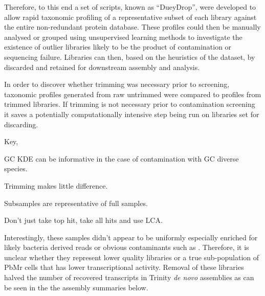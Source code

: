 Therefore, to this end a set of scripts, known as ``DueyDrop'', were developed to allow rapid taxonomic profiling of a
representative subset of each library against the entire non-redundant protein database.  
These profiles could then be manually analysed or grouped using unsupervised learning methods to investigate the existence of 
outlier libraries likely to be the product of contamination or sequencing failure.   Libraries can then,
based on the heuristics of the dataset, by discarded and retained for downstream assembly and analysis.

In order to discover whether trimming was necessary prior to screening, taxonomic profiles generated from raw untrimmed 
were compared to profiles from trimmed libraries. If trimming is not necessary prior to contamination screening
it saves a potentially computationally intensive step being run on libraries set for discarding.








Key, 

GC KDE can be informative in the case of contamination with GC diverse
species.

Trimming makes little difference.

Subsamples are representative of full samples.

Don't just take top hit, take all hits and use LCA.






Interestingly, these samples didn't appear to be uniformly especially enriched for likely bacteria derived reads or obvious contaminants
such as \citep{Homo sapiens}.  Therefore, it is unclear whether they represent lower quality 
libraries or a true sub-population of PbMr cells that has lower transcriptional activity.
Removal of these libraries halved the number of recovered transcripts in Trinity \textit{de novo} assemblies as can be seen in the the assembly
summaries below.




